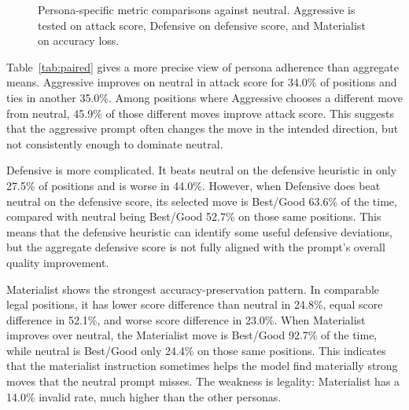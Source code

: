 \documentclass[10pt]{article}
\begin{document}
\begin{figure}[!htbp]
\centering
{}
\caption{Persona-specific metric comparisons against neutral. Aggressive is tested on attack score, Defensive on defensive score, and Materialist on accuracy loss.}
\label{fig:paired}
\end{figure}

Table~\ref{tab:paired} gives a more precise view of persona adherence than aggregate means. Aggressive improves on neutral in attack score for 34.0\% of positions and ties in another 35.0\%. Among positions where Aggressive chooses a different move from neutral, 45.9\% of those different moves improve attack score. This suggests that the aggressive prompt often changes the move in the intended direction, but not consistently enough to dominate neutral.

Defensive is more complicated. It beats neutral on the defensive heuristic in only 27.5\% of positions and is worse in 44.0\%. However, when Defensive does beat neutral on the defensive score, its selected move is Best/Good 63.6\% of the time, compared with neutral being Best/Good 52.7\% on those same positions. This means that the defensive heuristic can identify some useful defensive deviations, but the aggregate defensive score is not fully aligned with the prompt's overall quality improvement.

Materialist shows the strongest accuracy-preservation pattern. In comparable legal positions, it has lower score difference than neutral in 24.8\%, equal score difference in 52.1\%, and worse score difference in 23.0\%. When Materialist improves over neutral, the Materialist move is Best/Good 92.7\% of the time, while neutral is Best/Good only 24.4\% on those same positions. This indicates that the materialist instruction sometimes helps the model find materially strong moves that the neutral prompt misses. The weakness is legality: Materialist has a 14.0\% invalid rate, much higher than the other personas.
\end{document}
